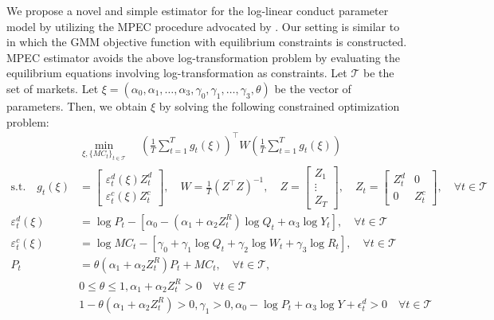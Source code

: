 \documentclass[11pt, a4paper]{article}
\begin{document}
We propose a novel and simple estimator for the log-linear conduct parameter model by utilizing the MPEC procedure advocated by \cite{su2012constrained}. Our setting is similar to \cite{dube2012improving} in which the GMM objective function with equilibrium constraints is constructed. 
MPEC estimator avoids the above log-transformation problem by evaluating the equilibrium equations involving log-transformation as constraints.
Let $\mathcal{T}$ be the set of markets. Let $\xi = (\alpha_0,\alpha_1, \ldots, \alpha_3, \gamma_0,\gamma_1, \ldots, \gamma_3, \theta)$ be the vector of parameters. Then, we obtain $\xi$ by solving the following constrained optimization problem:
\begin{align}
    &\min_{\xi, \{MC_t\}_{t\in \mathcal{T}}}\quad \left(\frac{1}{T}\sum_{t=1}^{T}g_{t}(\xi)\right)^{\top} W\left(\frac{1}{T}\sum_{t=1}^{T}g_{t}(\xi)\right) \label{eq:objective_gmm}\\
    \text{s.t.}\quad g_{t}(\xi)&=\left[\begin{array}{l}
\varepsilon^{d}_{t}(\xi)Z_{t}^{d} \\
\varepsilon^{c}_{t}(\xi)Z_{t}^{c}
\end{array}\right], \quad W=\frac{1}{T}(Z^\top Z)^{-1}, \quad Z=\left[\begin{array}{c}
Z_{1} \\
\vdots \\
Z_{T}
\end{array}\right],\quad Z_{t}=\left[\begin{array}{ll}
Z_{t}^{d} & 0 \\
0 & Z_{t}^{c}
\end{array}\right],\quad  \forall t \in \mathcal{T}\nonumber\\
    \varepsilon^{d}_{t}(\xi)&=\log P_{t} -[\alpha_0 - (\alpha_1 + \alpha_2 Z^{R}_{t}) \log Q_t + \alpha_3 \log Y_t],\quad  \forall t \in \mathcal{T} \label{eq:demand_gmm}\\
    \varepsilon^{c}_{t} (\xi)&= \log MC_t -[\gamma_0 + \gamma_1 \log Q_t +  \gamma_2 \log W_{t} + \gamma_3 \log R_t],\quad  \forall t \in \mathcal{T}\label{eq:supply_gmm}\\
    P_t &= \theta (\alpha_1 + \alpha_2 Z^{R}_{t})P_t + MC_t,\quad  \forall t \in \mathcal{T},\label{eq:equilibrium_constraint}\\
    &0\le\theta \le 1, \alpha_1 + \alpha_2 Z_{t}^{R} >0 \quad  \forall t \in \mathcal{T} \label{eq:reasonable_constraint}\\
    &1- \theta(\alpha_1 + \alpha_2 Z_{t}^{R}) >0, \gamma_1>0, \alpha_0 - \log P_{t} + \alpha_3 \log Y + \epsilon_{t}^{d} > 0\quad  \forall t \in \mathcal{T}
    \label{eq:equlibrium_existence}
\end{align}
\end{document}
